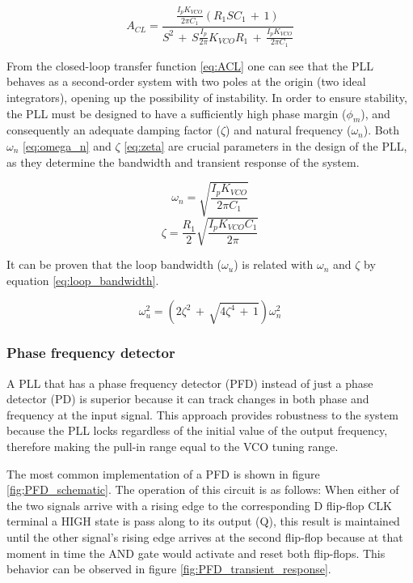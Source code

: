 \begin{equation}
    A_{CL} = \frac{\frac{I_p K_{VCO}}{2 \pi C_1} (R_1 S C_1 \, + \, 1)}{S^2 \, + \, S \frac{I_p}{2 \pi} K_{VCO} R_1 \, + \, \frac{I_p K_{VCO}}{2 \pi C_1}}
    \label{eq:ACL}
\end{equation}

\noindent From the closed-loop transfer function \eqref{eq:ACL} one can see that the PLL behaves as a second-order system with two poles at the 
origin (two ideal integrators), opening up the possibility of instability. In order to ensure stability, the PLL must be designed to have 
a sufficiently high phase margin ($\phi_m$), and consequently an adequate damping factor ($\zeta$) and natural frequency ($\omega_{n}$). 
Both $\omega_{n}$ \eqref{eq:omega_n} and $\zeta$ \eqref{eq:zeta} are crucial parameters in the design of the PLL, as they determine the bandwidth
and transient response of the system.

\begin{equation}
    \omega_{n} = \sqrt{\frac{I_p K_{VCO}}{2 \pi C_1}}
    \label{eq:omega_n}
\end{equation}
\begin{equation}
    \zeta = \frac{R_1}{2} \sqrt{\frac{I_p K_{VCO} C_1}{2 \pi}}
    \label{eq:zeta}
\end{equation}

\noindent It can be proven that the loop bandwidth ($\omega_u$) is related with $\omega_{n}$ and $\zeta$ by equation \eqref{eq:loop_bandwidth}.

\begin{equation}
    \omega_{u}^2 = (2 \zeta^2 \, + \, \sqrt{4 \zeta^4 \, + \, 1}) \omega_{n}^2
    \label{eq:loop_bandwidth}
\end{equation}

\subsubsection{Phase frequency detector}

A PLL that has a phase frequency detector (PFD) instead of just a phase detector (PD) is superior because it can track changes in both
phase and frequency at the input signal. This approach provides robustness to the system because the PLL locks regardless of the initial
value of the output frequency, therefore making the pull-in range equal to the VCO tuning range.

\noindent The most common implementation of a PFD is shown in figure \ref{fig;PFD_schematic}. The operation of this circuit is as follows:
When either of the two signals arrive with a rising edge to the corresponding D flip-flop CLK terminal a HIGH state is pass along
to its output (Q), this result is maintained until the other signal's rising edge arrives at the second flip-flop because at that
moment in time the AND gate would activate and reset both flip-flops. This behavior can be observed in figure \ref{fig:PFD_transient_response}.

